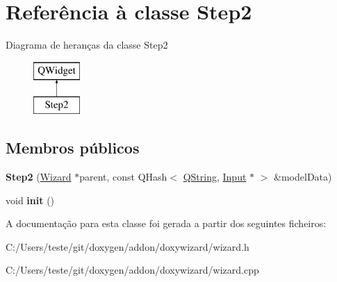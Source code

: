 \hypertarget{class_step2}{\section{Referência à classe Step2}
\label{class_step2}
}
Diagrama de heranças da classe Step2\begin{figure}[H]
\begin{center}
\leavevmode
\includegraphics[height=2.000000cm]{class_step2}
\end{center}
\end{figure}
\subsection*{Membros públicos}
\begin{DoxyCompactItemize}
\item 
\hypertarget{class_step2_aa26a1e3bd619108716c73865ff6dbb63}{{\bfseries Step2} (\hyperlink{class_wizard}{Wizard} $\ast$parent, const Q\-Hash$<$ \hyperlink{class_q_string}{Q\-String}, \hyperlink{class_input}{Input} $\ast$ $>$ \&model\-Data)}\label{class_step2_aa26a1e3bd619108716c73865ff6dbb63}

\item 
\hypertarget{class_step2_a02fd73d861ef2e4aabb38c0c9ff82947}{void {\bfseries init} ()}\label{class_step2_a02fd73d861ef2e4aabb38c0c9ff82947}

\end{DoxyCompactItemize}


A documentação para esta classe foi gerada a partir dos seguintes ficheiros\-:\begin{DoxyCompactItemize}
\item 
C\-:/\-Users/teste/git/doxygen/addon/doxywizard/wizard.\-h\item 
C\-:/\-Users/teste/git/doxygen/addon/doxywizard/wizard.\-cpp\end{DoxyCompactItemize}
